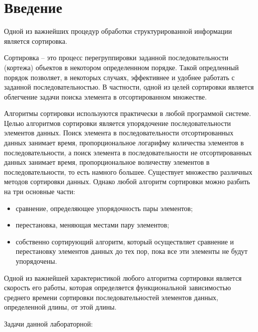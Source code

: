 \chapter*{Введение}

Одной из важнейших процедур обработки структурированной информации является сортировка.

Сортировка -- это процесс перегруппировки заданной последовательности (кортежа) объектов в некотором определеннном порядке. Такой опредленный порядок позволяет, в некоторых случаях, эффективнее и удобнее работать с заданной последовательностью. В частности, одной из целей сортировки является облегчение задачи поиска элемента в отсортированном множестве. 

Алгоритмы сортировки используются практически в любой программой системе. Целью алгоритмов сортировки является упорядочение последовательности элементов данных. Поиск элемента в последовательности отсортированных данных занимает время, пропорциональное логарифму количества элементов в последовательности, а поиск элемента в последовательности не отсортированных данных занимает время, пропорциональное воличеству элементов в последовательности, то есть намного большее. Существует множество различных методов сортировки данных. Однако любой алгоритм сортировки можно разбить на три основные части:

\begin{itemize}
	\item сравнение, определяющее упорядочность пары элементов;
	\item перестановка, меняющая местами пару элементов;
	\item собственно сортирующий алгоритм, который осуществляет сравнение
	и перестановку элементов данных до тех пор, пока все эти элементы
	не будут упорядочены.
\end{itemize}

Одной из важнейшей характеристикой любого алгоритма сортировки является скорость его работы, которая определяется функциональной зависимостью среднего времени сортировки последовательностей элементов данных, определенной длины, от этой длины.

\newpage
Задачи данной лабораторной:

